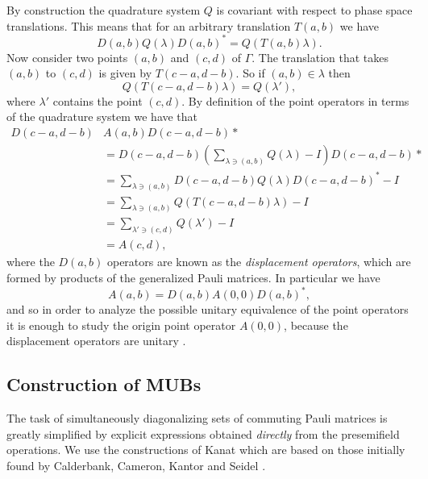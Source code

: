 \documentclass[a4paper, 11pt]{article}
\begin{document}
  By construction the quadrature system $Q$ is covariant
  with respect to phase space translations. This means that
  for an arbitrary translation $T(a,b)$ we have
  \begin{equation}
    D(a,b) Q(\lambda) D(a,b)^{*}
    = Q(T(a,b)\lambda).
  \end{equation}
  Now consider two points $(a,b)$ and $(c,d)$ of $\Gamma$.
  The translation that takes $(a,b)$ to $(c,d)$ is given by
  $T(c-a, d-b)$. So if $(a,b) \in \lambda$ then
  \begin{equation*}
    Q\left( T(c-a, d-b)\lambda \right) 
    = Q(\lambda'),
  \end{equation*}
  where $\lambda'$ contains the point $(c,d)$. By
  definition of the point operators in terms of the
  quadrature system we have that
  \begin{align*}
    D(c-a, d-b) &A(a,b) D(c-a, d-b)* \\
    &= D(c-a, d-b) \left( 
      \sum_{\lambda \ni (a,b)}^{} Q(\lambda) - I
    \right)  D(c-a, d-b)* \\
    &= \sum_{\lambda \ni (a,b)}^{}
    D(c-a,d-b) Q(\lambda) D(c-a,d-b)^{*} - I \\
    &= \sum_{\lambda \ni (a,b)}^{} Q(T(c-a,d-b)\lambda) - I
    \\
    &= \sum_{\lambda' \ni (c,d)}^{} Q(\lambda') - I \\
    &= A(c,d),
  \end{align*}
  where the $D(a,b)$ operators are known as the
  \textit{displacement operators}, which are formed by
  products of the generalized Pauli matrices. In particular
  we have 
  \[
    A(a,b) = D(a,b) A(0,0) D(a,b)^{*},
  \]
  and so in order to analyze the possible unitary
  equivalence of the point operators it is enough to study
  the origin point operator $A(0,0)$, because the
  displacement operators are unitary \cite{gibbons2004}.

  \subsection{Construction of MUBs}

  The task of simultaneously diagonalizing sets of commuting
  Pauli matrices is greatly simplified by explicit
  expressions obtained \textit{directly} from the
  presemifield operations. We use the constructions of Kanat
  \cite{abdukhalikov2015} which are based on those initially
  found by Calderbank, Cameron, Kantor and Seidel
  \cite{calderbank}.
\end{document}
